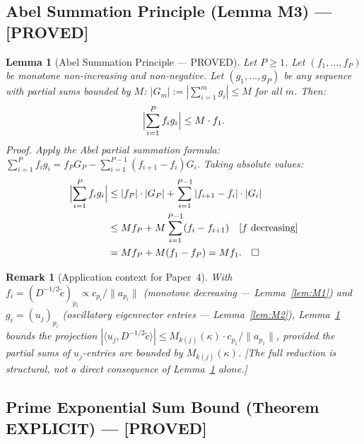 \documentclass[11pt]{article}
\newtheorem{lemma}[theorem]{Lemma}
\newtheorem*{remark}{Remark}
\begin{document}
\subsection{Abel Summation Principle (Lemma M3) --- [PROVED]}

\begin{lemma}[Abel Summation Principle --- PROVED]\label{lem:M3}
Let $P\geq 1$.
Let $(f_1,\ldots,f_P)$ be monotone non-increasing and non-negative.
Let $(g_1,\ldots,g_P)$ be any sequence with partial sums bounded by $M$:
$|G_m| := |\sum_{i=1}^m g_i|\leq M$ for all $m$.
Then:
\[
\Bigl|\sum_{i=1}^P f_i g_i\Bigr| \leq M\cdot f_1.
\]
\emph{Proof.}
Apply the Abel partial summation formula:
$\sum_{i=1}^P f_i g_i = f_P G_P - \sum_{i=1}^{P-1}(f_{i+1}-f_i)G_i$.
Taking absolute values:
\begin{align*}
\Bigl|\sum_{i=1}^P f_i g_i\Bigr|
&\leq |f_P|\cdot|G_P| + \sum_{i=1}^{P-1}|f_{i+1}-f_i|\cdot|G_i| \\
&\leq Mf_P + M\sum_{i=1}^{P-1}(f_i-f_{i+1})
 \quad\text{[$f$ decreasing]} \\
&= Mf_P + M(f_1-f_P) = Mf_1. \quad\square
\end{align*}
\end{lemma}

\begin{remark}[Application context for Paper~4]
With $f_i = (D^{-1/2}\tilde{c})_{p_i}\propto c_{p_i}/\|a_{p_i}\|$
(monotone decreasing --- Lemma~\ref{lem:M1}) and $g_i = (u_j)_{p_i}$
(oscillatory eigenvector entries --- Lemma~\ref{lem:M2}),
Lemma~\ref{lem:M3} bounds the projection
$|\langle u_j, D^{-1/2}\tilde{c}\rangle|
\leq M_{k(j)}(\kappa)\cdot c_{p_1}/\|a_{p_1}\|$,
provided the partial sums of $u_j$-entries are bounded by
$M_{k(j)}(\kappa)$.
\emph{[The full reduction is structural, not a direct consequence of
Lemma~\ref{lem:M3} alone.]}
\end{remark}

\subsection{Prime Exponential Sum Bound (Theorem EXPLICIT) --- [PROVED]}
\end{document}
